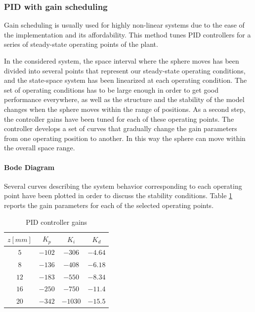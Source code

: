 \subsubsection{PID with gain scheduling}
\label{subsubsec:pid_gain_scheduling}

Gain scheduling is usually used for highly non-linear systems due to the ease of the implementation and its affordability.
This method tunes PID controllers for a series of steady-state operating points of the plant.

In the considered system, the space interval where the sphere moves has been divided into several points that represent our steady-state operating conditions, and the state-space system has been linearized at each operating condition.
The set of operating conditions has to be large enough in order to get good performance everywhere, as well as the structure and the stability of the model changes when the sphere moves within the range of positions.
As a second step, the controller gains have been tuned for each of these operating points.
The controller develops a set of curves that gradually change the gain parameters from one operating position to another.
In this way the sphere can move within the overall space range.

\paragraph{Bode Diagram}

Several curves describing the system behavior corresponding to each operating point have been plotted in order to discuss the stability conditions.
Table \ref{tab:pid_gain_scheduling_gains} reports the gain parameters for each of the selected operating points.

\begin{table}[H]
    \centering

    \begin{tabular}{|c|c|c|c|}
        \hline
        $z [mm]$ & $K_p$  & $K_i$   & $K_d$   \\
        \hline
        $5$      & $-102$ & $-306$  & $-4.64$ \\
        $8$      & $-136$ & $-408$  & $-6.18$ \\
        $12$     & $-183$ & $-550$  & $-8.34$ \\
        $16$     & $-250$ & $-750$  & $-11.4$ \\
        $20$     & $-342$ & $-1030$ & $-15.5$ \\
        \hline
    \end{tabular}

    \caption{PID controller gains}
    \label{tab:pid_gain_scheduling_gains}

\end{table}


